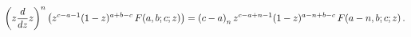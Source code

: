 \[\left(z\frac{d}{dz}z\right)^{n}\left(z^{c-a-1}(1-z)^{a+b-c}\mathop{F\/}%
\nolimits\!\left(a,b;c;z\right)\right)=\left(c-a\right)_{n}z^{c-a+n-1}(1-z)^{a%
-n+b-c}\*\mathop{F\/}\nolimits\!\left(a-n,b;c;z\right).\]